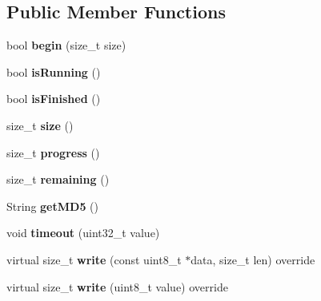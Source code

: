 \subsection*{Public Member Functions}
\begin{DoxyCompactItemize}
\item 
\mbox{\label{class_flash_writer_a1376815be0390bdedfd3d59eda900732}} 
bool {\bfseries begin} (size\+\_\+t size)
\item 
\mbox{\label{class_flash_writer_a41447872c8c0ecb37bdd9bdae4fa8dc2}} 
bool {\bfseries is\+Running} ()
\item 
\mbox{\label{class_flash_writer_a51781bc5e919454056cfaed0156873a3}} 
bool {\bfseries is\+Finished} ()
\item 
\mbox{\label{class_flash_writer_a18950100a30881380d55a348bd1e1526}} 
size\+\_\+t {\bfseries size} ()
\item 
\mbox{\label{class_flash_writer_af395626466b39b7aed1da7598e1e2e67}} 
size\+\_\+t {\bfseries progress} ()
\item 
\mbox{\label{class_flash_writer_a99c79273d8c09f12c9ad5a2c304fc346}} 
size\+\_\+t {\bfseries remaining} ()
\item 
\mbox{\label{class_flash_writer_a8a38cd9ac0b6fcd17e843d0b43e9f553}} 
String {\bfseries get\+M\+D5} ()
\item 
\mbox{\label{class_flash_writer_a4dbb71d7dd54a7045f67cc7b9b67cfdb}} 
void {\bfseries timeout} (uint32\+\_\+t value)
\item 
\mbox{\label{class_flash_writer_aa22c6cb879da90b10d677fcd04fdf349}} 
virtual size\+\_\+t {\bfseries write} (const uint8\+\_\+t $\ast$data, size\+\_\+t len) override
\item 
\mbox{\label{class_flash_writer_ad38210dcd95926ac5c9538a247580bff}} 
virtual size\+\_\+t {\bfseries write} (uint8\+\_\+t value) override
\item 
\mbox{\label{class_flash_writer_ae77a296342ed2e6a182a47e3723ec793}} 

\end{DoxyCompactItemize}
